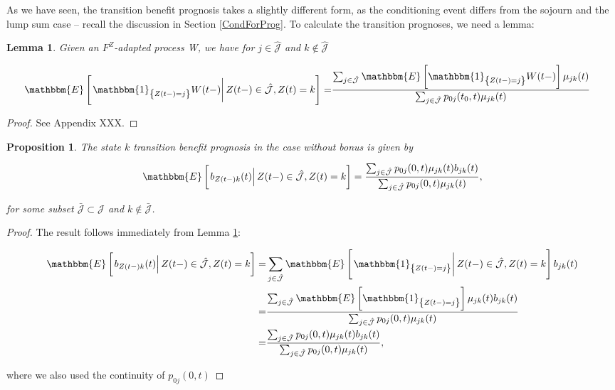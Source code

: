 \documentclass{book}
\newcommand{\1}[1]{\mathbbm{1}_{\left\lbrace #1 \right\rbrace}}
\newcommand{\expec}[1][def]{\mathbbm{E} \left[ #1 \right]}
\newcommand{\econd}[2][def]{\mathbbm{E} \left[ \left. #1 \right| #2 \right]}
\theoremstyle{break}
\newtheorem{proposition}[definition]{Proposition}%
\newtheorem{lemma}[definition]{Lemma}
\theoremstyle{remark}
\numberwithin{equation}{section}
\begin{document}
As we have seen, the transition benefit prognosis takes a slightly different form, as the conditioning event differs from the sojourn and the lump sum case -- recall the discussion in Section \ref{CondForProg}. To calculate the transition prognoses, we need a lemma:

\begin{lemma} \label{Split}
	Given an $F^Z$-adapted process W, we have for $j \in \hat{\mathcal{J}}$ and $k \notin \hat{\mathcal{J}}$
	
	\begin{align*}
		\econd[\1{Z(t-)=j} W(t-)]{Z(t-) \in \hat{\mathcal{J}}, Z(t) = k} =& \frac{\sum_{j \in \hat{\mathcal{J}}} \expec[\1{Z(t-)=j} W(t-)] \mu_{jk}(t)}{\sum_{j \in \hat{\mathcal{J}}} p_{0j}(t_0,t) \mu_{jk}(t)}
	\end{align*}
\end{lemma}
\begin{proof}
	See Appendix XXX.
\end{proof}

\begin{proposition} \label{TransitionWithoutBonus}
The state $k$ transition benefit prognosis in the case without bonus is given by

\begin{align*}
    \econd[b_{Z(t-)k}(t)]{Z(t-) \in \hat{\mathcal{J}}, Z(t)=k} = \frac{\sum_{j \in \hat{\mathcal{J}}} p_{0j}(0,t) \mu_{jk}(t) b_{jk}(t)}{\sum_{j \in \hat{\mathcal{J}}} p_{0j}(0,t) \mu_{jk}(t)},
\end{align*}

for some subset $\bar{\mathcal{J}} \subset \mathcal{J}$ and $k \notin \bar{\mathcal{J}}$.
\end{proposition}
\begin{proof}
The result follows immediately from Lemma \ref{Split}:

\begin{align*}
	\econd[b_{Z(t-)k}(t)]{Z(t-) \in \hat{\mathcal{J}}, Z(t)=k} =& \sum_{j \in \hat{\mathcal{J}}} \econd[\1{Z(t-)=j}]{Z(t-) \in \hat{\mathcal{J}}, Z(t) = k} b_{jk}(t) \\
	=&\frac{\sum_{j \in \hat{\mathcal{J}}} \expec[\1{Z(t-)=j}] \mu_{jk}(t) b_{jk}(t)}{\sum_{j \in \hat{\mathcal{J}}} p_{0j}(0,t) \mu_{jk}(t)} \\
	=&\frac{\sum_{j \in \hat{\mathcal{J}}} p_{0j}(0,t) \mu_{jk}(t) b_{jk}(t)}{\sum_{j \in \hat{\mathcal{J}}} p_{0j}(0,t) \mu_{jk}(t)},
\end{align*}

where we also used the continuity of $p_{0j}(0,t)$
\end{proof}
\end{document}
